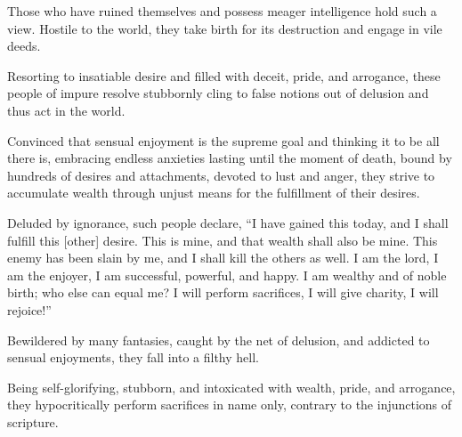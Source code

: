 {Those who have ruined themselves and possess meager intelligence hold such a view. Hostile to the world, they take birth for its destruction and engage in vile deeds.}

{Resorting to insatiable desire and filled with deceit, pride, and arrogance, these people of impure resolve stubbornly cling to false notions out of delusion and thus act in the world.}

{Convinced that sensual enjoyment is the supreme goal and thinking it to be all there is, embracing endless anxieties lasting until the moment of death, bound by hundreds of desires and attachments, devoted to lust and anger, they strive to accumulate wealth through unjust means for the fulfillment of their desires.}

{Deluded by ignorance, such people declare, \enquote{I have gained this today, and I shall fulfill this [other] desire. This is mine, and that wealth shall also be mine. This enemy has been slain by me, and I shall kill the others as well. I am the lord, I am the enjoyer, I am successful, powerful, and happy. I am wealthy and of noble birth; who else can equal me? I will perform sacrifices, I will give charity, I will rejoice!}}

{Bewildered by many fantasies, caught by the net of delusion, and addicted to sensual enjoyments, they fall into a filthy hell.}

{Being self-glorifying, stubborn, and intoxicated with wealth, pride, and arrogance, they hypocritically perform sacrifices in name only, contrary to the injunctions of scripture.}

